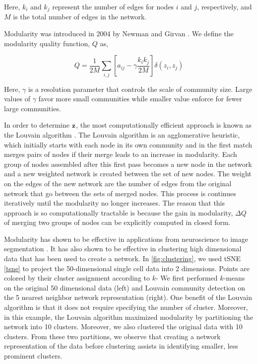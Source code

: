 Here, $k_{i}$ and $k_{j}$ represent the number of edges for nodes $i$ and $j$, respectively, and $M$ is the total number of edges in the network. 

\indent Modularity was introduced in 2004 by Newman and Girvan \cite{newmangirvan}. We define the modularity quality function, $Q$ as,

\begin{equation}
Q=\frac{1}{2M}\sum_{i,j}\left[a_{ij}-\gamma \frac{k_{i}k_{j}}{2M}\right]\delta(z_{i},z_{j})
\end{equation} 

Here, $\gamma$ is a resolution parameter \cite{resParam} that controls the scale of community size. Large values of $\gamma$ favor more small communities while smaller value enforce for fewer large communities. 

\indent In order to determine ${\bf z}$, the most computationally efficient approach is known as the Louvain algorithm \cite{blondel}. The Louvain algorithm is an agglomerative heuristic, which initially starts with each node in its own community and in the first match merges pairs of nodes if their merge leads to an increase in modularity. Each group of nodes assembled after this first pass becomes a new node in the network and a new weighted network is created between the set of new nodes. The weight on the edges of the new network are the number of edges from the original network that go between the sets of merged nodes. This process is continues iteratively until the modularity no longer increases. The reason that this approach is so computationally tractable is because the gain in modularity, $\Delta Q$ of merging two groups of nodes can be explicitly computed in closed form.

\indent Modularity has shown to be effective in applications from neuroscience \cite{hierarchicalmod} to image segmentation \cite{browet}. It has also shown to be effective in clustering high dimensional data that has been used to create a network. In \ref{fig:clustering}, we used tSNE \ref{tsne} to project the 50-dimensional single cell data into 2 dimensions. Points are colored by their cluster assignment according to $k$- We first performed $k$-means on the original 50 dimensional data (left) and Louvain community detection on the 5 nearest neighbor network representation (right). One benefit of the Louvain algorithm is that it does not require specifying the number of cluster. Moreover, in this example, the Louvain algorithm maximized modularity by partitioning the network into 10 clusters. Moreover, we also clustered the original data with 10 clusters. From these two partitions, we observe that creating a network representation of the data before clustering assists in identifying smaller, less prominent clusters.


